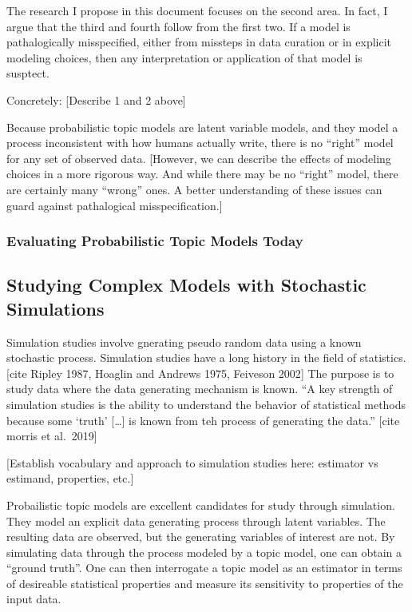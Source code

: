 \documentclass[conference,final,]{IEEEtran}
\begin{document}
The research I propose in this document focuses on the second area. In
fact, I argue that the third and fourth follow from the first two. If a
model is pathalogically misspecified, either from missteps in data
curation or in explicit modeling choices, then any interpretation or
application of that model is susptect.

Concretely: {[}Describe 1 and 2 above{]}

Because probabilistic topic models are latent variable models, and they
model a process inconsistent with how humans actually write, there is no
``right'' model for any set of observed data. {[}However, we can
describe the effects of modeling choices in a more rigorous way. And
while there may be no ``right'' model, there are certainly many
``wrong'' ones. A better understanding of these issues can guard against
pathalogical misspecification.{]}

\hypertarget{evaluating-probabilistic-topic-models-today}{%
\subsubsection{Evaluating Probabilistic Topic Models
Today}\label{evaluating-probabilistic-topic-models-today}}

\hypertarget{studying-complex-models-with-stochastic-simulations}{%
\subsection{Studying Complex Models with Stochastic
Simulations}\label{studying-complex-models-with-stochastic-simulations}}

Simulation studies involve gnerating pseudo random data using a known
stochastic process. Simulation studies have a long history in the field
of statistics. {[}cite Ripley 1987, Hoaglin and Andrews 1975, Feiveson
2002{]} The purpose is to study data where the data generating mechanism
is known. ``A key strength of simulation studies is the ability to
understand the behavior of statistical methods because some `truth'
{[}\ldots{}{]} is known from teh process of generating the data.''
{[}cite morris et al.~2019{]}

{[}Establish vocabulary and approach to simulation studies here:
estimator vs estimand, properties, etc.{]}

Probailistic topic models are excellent candidates for study through
simulation. They model an explicit data generating process through
latent variables. The resulting data are observed, but the generating
variables of interest are not. By simulating data through the process
modeled by a topic model, one can obtain a ``ground truth''. One can
then interrogate a topic model as an estimator in terms of desireable
statistical properties and measure its sensitivity to properties of the
input data.
\end{document}
